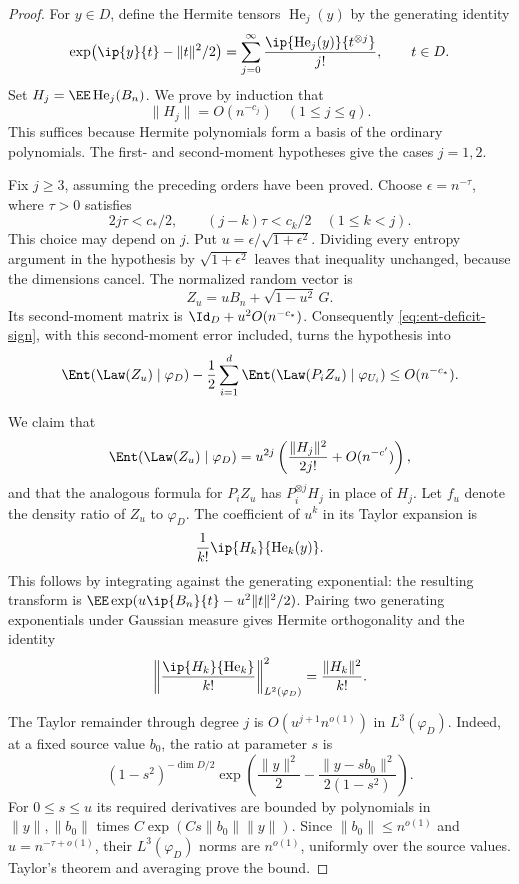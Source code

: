 \begin{proof}
For \(y\in D\), define the Hermite tensors \(\operatorname{He}_j(y)\)
by the generating identity
\[
 \exp\bigl(\ip{y}{t}-\|t\|^2/2\bigr)
 =\sum_{j=0}^\infty
       \frac{\ip{\operatorname{He}_j(y)}{t^{\otimes j}}}{j!},
 \qquad t\in D.
\]
Set \(H_j=\EE\operatorname{He}_j(B_n)\). We prove by induction that
\begin{equation}\label{eq:ent-hermite-small}
 \|H_j\|=O(n^{-c_j})
 \quad(1\le j\le q).
\end{equation}
This suffices because Hermite polynomials form a basis of the ordinary
polynomials. The first- and second-moment hypotheses give the cases
\(j=1,2\).

Fix \(j\ge3\), assuming the preceding orders have been proved.
Choose \(\epsilon=n^{-\tau}\), where \(\tau>0\) satisfies
\[
 2j\tau<c_*/2,\qquad
 (j-k)\tau<c_k/2\quad(1\le k<j).
\]
This choice may depend on \(j\).
Put \(u=\epsilon/\sqrt{1+\epsilon^2}\).
Dividing every entropy argument in the hypothesis by
\(\sqrt{1+\epsilon^2}\) leaves that inequality unchanged, because
the dimensions cancel. The normalized random vector is
\[
 Z_u=uB_n+\sqrt{1-u^2}\,G.
\]
Its second-moment matrix is \(\Id_D+u^2O(n^{-c_*})\).
Consequently \eqref{eq:ent-deficit-sign}, with this second-moment
error included, turns the hypothesis into
\begin{equation}\label{eq:ent-relative-deficit}
 \Ent(\Law(Z_u)\mid\varphi_D)
 -\frac12\sum_{i=1}^d
       \Ent(\Law(P_iZ_u)\mid\varphi_{U_i})
 \le O(n^{-c_*}).
\end{equation}

We claim that
\begin{equation}\label{eq:ent-relative-expansion}
 \Ent(\Law(Z_u)\mid\varphi_D)
 =u^{2j}\left(\frac{\|H_j\|^2}{2j!}+O(n^{-c'})\right),
\end{equation}
and that the analogous formula for \(P_iZ_u\) has
\(P_i^{\otimes j}H_j\) in place of \(H_j\).
Let \(f_u\) denote the density ratio of \(Z_u\) to \(\varphi_D\).
The coefficient of \(u^k\) in its Taylor expansion is
\[
 \frac1{k!}\ip{H_k}{\operatorname{He}_k(y)}.
\]
This follows by integrating against the generating exponential:
the resulting transform is
\(\EE\exp(u\ip{B_n}{t}-u^2\|t\|^2/2)\).
Pairing two generating exponentials under Gaussian measure gives
Hermite orthogonality and the identity
\[
 \left\|\frac{\ip{H_k}{\operatorname{He}_k}}{k!}\right\|_{L^2(\varphi_D)}^2
 =\frac{\|H_k\|^2}{k!}.
\]

The Taylor remainder through degree \(j\) is
\(O(u^{j+1}n^{o(1)})\) in \(L^3(\varphi_D)\).
Indeed, at a fixed source value \(b_0\), the ratio at parameter \(s\) is
\[
 (1-s^2)^{-\dim D/2}
 \exp\left(\frac{\|y\|^2}{2}
       -\frac{\|y-sb_0\|^2}{2(1-s^2)}\right).
\]
For \(0\le s\le u\) its required derivatives are bounded by
polynomials in \(\|y\|,\|b_0\|\) times
\(C\exp(Cs\|b_0\|\|y\|)\).
Since \(\|b_0\|\le n^{o(1)}\) and \(u=n^{-\tau+o(1)}\),
their \(L^3(\varphi_D)\) norms are \(n^{o(1)}\), uniformly over
the source values. Taylor's theorem and averaging prove the bound.


\end{proof}
